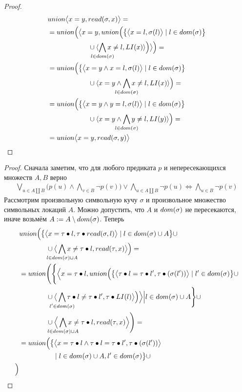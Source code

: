 \readstoreinvariantlemma*
\begin{proof}
\begin{align*}
&\aunion{\paiR{\mg{x}{y}}{\deref{\sigma}{x}}}=\\
&=\Union{\paiR{\mg{x}{y}}{\rdbody{x}{\sigma}{\li{x}}}}=\\
&=\rdbodyext{x}{\sigma}{\li{x}}{\mg{x}{y}\wedge}{l}=\\
&=\rdbodyext{y}{\sigma}{\li{y}}{\mg{x}{y}\wedge}{l}=\\
&=\aunion{\paiR{\mg{x}{y}}{\deref{\sigma}{y}}}
\end{align*}
\end{proof}

\mergefindlemma*
\begin{proof}
Сначала заметим, что для любого предиката $p$ и непересекающихся множеств $A, B$ верно
\begin{align}\label{eq:merge-find-predicate-prop}
\bigvee_{u\in A\coprod B}{\Big(p(u)\wedge\bigwedge_{v\in B}{\neg p(v)}\Big)\vee\bigwedge_{u\in A\coprod B}{\neg p(u)}} \iff \bigwedge_{u\in B}{\neg p(v)}
\end{align}
Рассмотрим произвольную символьную кучу $\sigma$ и произвольное множество символьных локаций $A$. Можно допустить, что $A$ и $dom(\sigma)$ не пересекаются, иначе возьмём $A := A\setminus dom(\sigma)$. Теперь
\begin{align}\label{eq:merge-find-union-prop}
&\Union{\big\{\paiR{\mg{x}{\fillterm{\tau}{l}}}{\fillterm{\tau}{\deref{\sigma}{l}}} \mid l\in\dom{\sigma}\cup A\big\}\cup\notag\\
	&\qquad\qquad\cup\paiR{\bigwedge_{\mathclap{l\in\dom{\sigma}\cup A}}{\nmg{x}{\fillterm{\tau}{l}}}}{\deref{\tau}{x}}}=\notag\\
&=\UNION{\Bigg\{\Pair{\mg{x}{\fillterm{\tau}{l}}}{\Union{\big\{\paiR{\mg{\fillterm{\tau}{l}}{\fillterm{\tau}{l'}}}{\fillterm{\tau}{(\sigma(l'))}} \mid l'\in\dom{\sigma} \big\}\cup\notag\\
&\qquad\qquad\cup\paiR{\bigwedge_{\mathclap{l'\in\dom{\sigma}}}{\nmg{\fillterm{\tau}{l}}{\fillterm{\tau}{l'}}}}{\fillterm{\tau}{\li{l}}}}
} \Big\vert l\in\dom{\sigma}\cup A\Bigg\}\cup\notag\\
	&\qquad\qquad\cup\Pair{\bigwedge_{\mathclap{l\in\dom{\sigma}\cup A}}{\nmg{x}{\fillterm{\tau}{l}}}}{\deref{\tau}{x}}}=\notag\\
&=\Union{\big\{\paiR{\mg{x}{\fillterm{\tau}{l}}\wedge\mg{\fillterm{\tau}{l}}{\fillterm{\tau}{l'}}}{\fillterm{\tau}{(\sigma(l'))}}\notag\\
	&\qquad\qquad\quad\mid l\in\dom{\sigma}\cup A, l'\in\dom{\sigma}\big\}\cup\notag\\
}
\end{align}
\end{proof}
